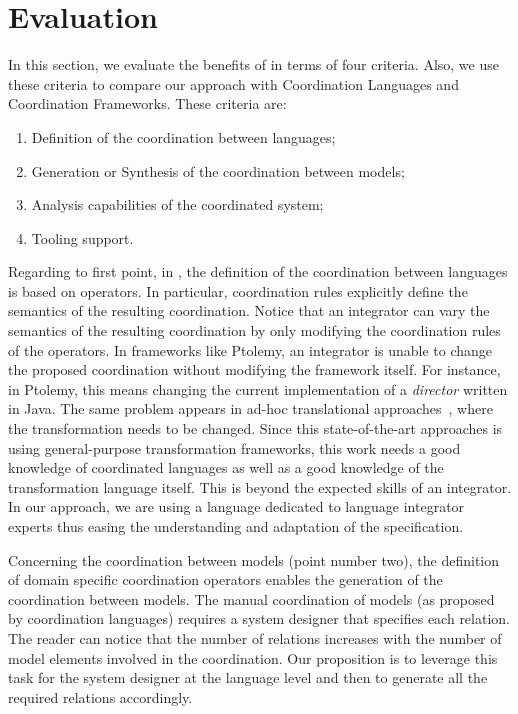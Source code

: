 \section{Evaluation}
\label{sec:evaluation}
In this section, we evaluate the benefits of  \bcool in terms of four criteria. Also, we use these criteria to compare our approach with Coordination Languages and Coordination Frameworks. These criteria are:
	\begin{enumerate}
		\item Definition of the coordination between languages;
		\item Generation or Synthesis of the coordination between models; 
		\item Analysis capabilities of the coordinated system;
		\item Tooling support.
	\end{enumerate}  

Regarding to first point, in \bcool, the definition of the coordination between languages is based on operators. In particular, coordination rules explicitly define the semantics of the resulting coordination. Notice that an integrator can vary the semantics of the resulting coordination by only modifying the coordination rules of the operators. In frameworks like Ptolemy, an integrator is unable to change the proposed coordination without modifying the framework itself. For instance, in Ptolemy, this means changing the current implementation of a \emph{director} written in Java. The same problem appears in ad-hoc translational approaches~\cite{dinatale}, where the transformation needs to be changed. Since this state-of-the-art approaches is using general-purpose transformation frameworks, this work needs a good knowledge of coordinated languages as well as a good knowledge of the transformation language itself. This is beyond the expected skills of an integrator. In our approach, we are using a language dedicated to language integrator experts thus easing the understanding and adaptation of the \bcool specification. 

Concerning the coordination between models (point number two), the definition of domain specific coordination operators enables the generation of the coordination between models. The manual coordination of models (as proposed by coordination languages) requires a system designer that specifies each relation. The reader can notice that the number of relations increases with the number of model elements involved in the coordination. Our proposition is to leverage this task for the system designer at the language level and then to generate all the required relations accordingly.

